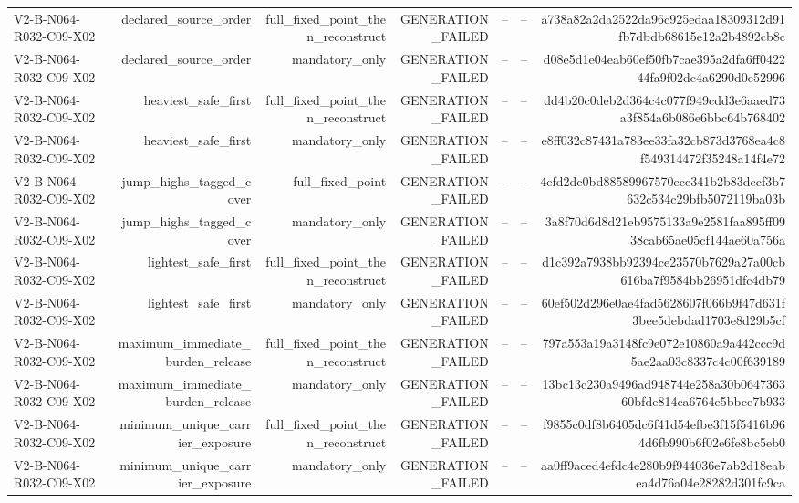 {\begin{longtable}{lrrrrrr}
V2-B-N064-R032-C09-X02 & declared\_source\_order & full\_fixed\_point\_then\_reconstruct & GENERATION\_FAILED & -- & -- & a738a82a2da2522da96c925edaa18309312d91fb7dbdb68615e12a2b4892cb8c \\
V2-B-N064-R032-C09-X02 & declared\_source\_order & mandatory\_only & GENERATION\_FAILED & -- & -- & d08e5d1e04eab60ef50fb7cae395a2dfa6ff042244fa9f02dc4a6290d0e52996 \\
V2-B-N064-R032-C09-X02 & heaviest\_safe\_first & full\_fixed\_point\_then\_reconstruct & GENERATION\_FAILED & -- & -- & dd4b20c0deb2d364c4c077f949cdd3e6aaed73a3f854a6b086e6bbc64b768402 \\
V2-B-N064-R032-C09-X02 & heaviest\_safe\_first & mandatory\_only & GENERATION\_FAILED & -- & -- & e8ff032c87431a783ee33fa32cb873d3768ea4c8f549314472f35248a14f4e72 \\
V2-B-N064-R032-C09-X02 & jump\_highs\_tagged\_cover & full\_fixed\_point & GENERATION\_FAILED & -- & -- & 4efd2dc0bd88589967570ece341b2b83dccf3b7632c534c29bfb5072119ba03b \\
V2-B-N064-R032-C09-X02 & jump\_highs\_tagged\_cover & mandatory\_only & GENERATION\_FAILED & -- & -- & 3a8f70d6d8d21eb9575133a9e2581faa895ff0938cab65ae05cf144ae60a756a \\
V2-B-N064-R032-C09-X02 & lightest\_safe\_first & full\_fixed\_point\_then\_reconstruct & GENERATION\_FAILED & -- & -- & d1c392a7938bb92394ce23570b7629a27a00cb616ba7f9584bb26951dfc4db79 \\
V2-B-N064-R032-C09-X02 & lightest\_safe\_first & mandatory\_only & GENERATION\_FAILED & -- & -- & 60ef502d296e0ae4fad5628607f066b9f47d631f3bee5debdad1703e8d29b5cf \\
V2-B-N064-R032-C09-X02 & maximum\_immediate\_burden\_release & full\_fixed\_point\_then\_reconstruct & GENERATION\_FAILED & -- & -- & 797a553a19a3148fc9e072e10860a9a442ccc9d5ae2aa03c8337c4c00f639189 \\
V2-B-N064-R032-C09-X02 & maximum\_immediate\_burden\_release & mandatory\_only & GENERATION\_FAILED & -- & -- & 13bc13c230a9496ad948744e258a30b064736360bfde814ca6764e5bbce7b933 \\
V2-B-N064-R032-C09-X02 & minimum\_unique\_carrier\_exposure & full\_fixed\_point\_then\_reconstruct & GENERATION\_FAILED & -- & -- & f9855c0df8b6405dc6f41d54efbe3f15f5416b964d6fb990b6f02e6fe8bc5eb0 \\
V2-B-N064-R032-C09-X02 & minimum\_unique\_carrier\_exposure & mandatory\_only & GENERATION\_FAILED & -- & -- & aa0ff9aced4efdc4e280b9f944036e7ab2d18eabea4d76a04e28282d301fc9ca \\

\end{longtable}}
